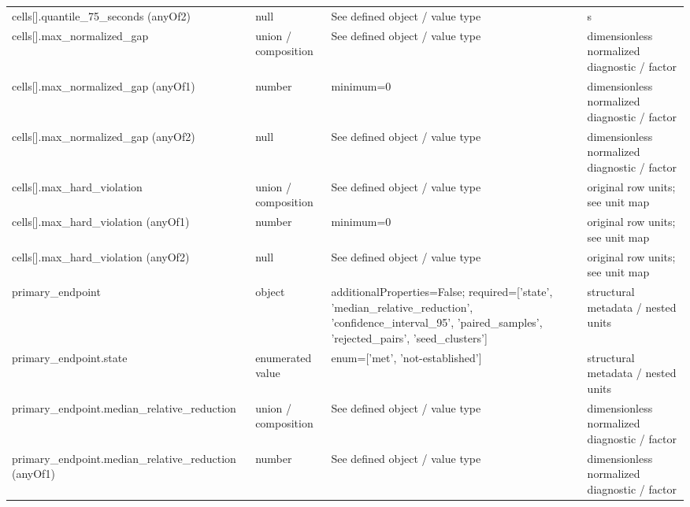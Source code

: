 \begin{longtable}{@{}>{\raggedright\arraybackslash}p{}>{\raggedright\arraybackslash}p{}>{\raggedright\arraybackslash}p{}>{\raggedright\arraybackslash}p{}@{}}
cells[].\allowbreak{}quantile\_\allowbreak{}75\_\allowbreak{}seconds (anyOf2) & null & See defined object /\allowbreak{} value type & s\\
cells[].\allowbreak{}max\_\allowbreak{}normalized\_\allowbreak{}gap & union /\allowbreak{} composition & See defined object /\allowbreak{} value type & dimensionless normalized diagnostic /\allowbreak{} factor\\
cells[].\allowbreak{}max\_\allowbreak{}normalized\_\allowbreak{}gap (anyOf1) & number & minimum=\allowbreak{}0 & dimensionless normalized diagnostic /\allowbreak{} factor\\
cells[].\allowbreak{}max\_\allowbreak{}normalized\_\allowbreak{}gap (anyOf2) & null & See defined object /\allowbreak{} value type & dimensionless normalized diagnostic /\allowbreak{} factor\\
cells[].\allowbreak{}max\_\allowbreak{}hard\_\allowbreak{}violation & union /\allowbreak{} composition & See defined object /\allowbreak{} value type & original row units; see unit map\\
cells[].\allowbreak{}max\_\allowbreak{}hard\_\allowbreak{}violation (anyOf1) & number & minimum=\allowbreak{}0 & original row units; see unit map\\
cells[].\allowbreak{}max\_\allowbreak{}hard\_\allowbreak{}violation (anyOf2) & null & See defined object /\allowbreak{} value type & original row units; see unit map\\
primary\_\allowbreak{}endpoint & object & additionalProperties=\allowbreak{}False; required=\allowbreak{}['state', 'median\_\allowbreak{}relative\_\allowbreak{}reduction', 'confidence\_\allowbreak{}interval\_\allowbreak{}95', 'paired\_\allowbreak{}samples', 'rejected\_\allowbreak{}pairs', 'seed\_\allowbreak{}clusters'] & structural metadata /\allowbreak{} nested units\\
primary\_\allowbreak{}endpoint.\allowbreak{}state & enumerated value & enum=\allowbreak{}['met', 'not-\allowbreak{}established'] & structural metadata /\allowbreak{} nested units\\
primary\_\allowbreak{}endpoint.\allowbreak{}median\_\allowbreak{}relative\_\allowbreak{}reduction & union /\allowbreak{} composition & See defined object /\allowbreak{} value type & dimensionless normalized diagnostic /\allowbreak{} factor\\
primary\_\allowbreak{}endpoint.\allowbreak{}median\_\allowbreak{}relative\_\allowbreak{}reduction (anyOf1) & number & See defined object /\allowbreak{} value type & dimensionless normalized diagnostic /\allowbreak{} factor\\

\end{longtable}
